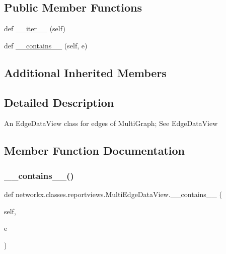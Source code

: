 \subsection*{Public Member Functions}
\begin{DoxyCompactItemize}
\item 
def \hyperlink{classnetworkx_1_1classes_1_1reportviews_1_1MultiEdgeDataView_a96ccac00e6d408db5689aecc940076a7}{\+\_\+\+\_\+iter\+\_\+\+\_\+} (self)
\item 
def \hyperlink{classnetworkx_1_1classes_1_1reportviews_1_1MultiEdgeDataView_a53e6a6d6009113ca5cb08d05e14c7800}{\+\_\+\+\_\+contains\+\_\+\+\_\+} (self, e)
\end{DoxyCompactItemize}
\subsection*{Additional Inherited Members}


\subsection{Detailed Description}
\begin{DoxyVerb}An EdgeDataView class for edges of MultiGraph; See EdgeDataView\end{DoxyVerb}
 

\subsection{Member Function Documentation}
\mbox{\label{classnetworkx_1_1classes_1_1reportviews_1_1MultiEdgeDataView_a53e6a6d6009113ca5cb08d05e14c7800}} 
\subsubsection{\texorpdfstring{\+\_\+\+\_\+contains\+\_\+\+\_\+()}{\_\_contains\_\_()}}
{\footnotesize\ttfamily def networkx.\+classes.\+reportviews.\+Multi\+Edge\+Data\+View.\+\_\+\+\_\+contains\+\_\+\+\_\+ (\begin{DoxyParamCaption}\item[{}]{self,  }\item[{}]{e }\end{DoxyParamCaption})}

